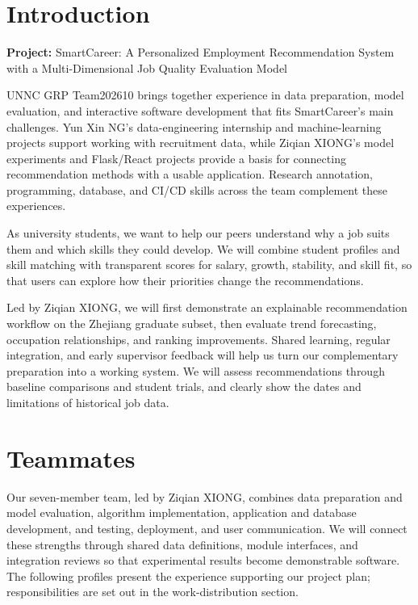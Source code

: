 \documentclass[a4paper,12pt]{article}
\title{\BidTitle}
\author{\BidTeam}
\date{\BidDate}
\newcommand{\BidProjectName}{SmartCareer: A Personalized Employment Recommendation System with a Multi-Dimensional Job Quality Evaluation Model}
\begin{document}
\maketitle
\thispagestyle{plain}
\tableofcontents
\newpage

\section{Introduction}
\noindent\textbf{Project:} \BidProjectName
\par\medskip
UNNC GRP Team202610 brings together experience in data preparation, model evaluation, and interactive software development that fits SmartCareer's main challenges. Yun Xin NG's data-engineering internship and machine-learning projects support working with recruitment data, while Ziqian XIONG's model experiments and Flask/React projects provide a basis for connecting recommendation methods with a usable application. Research annotation, programming, database, and CI/CD skills across the team complement these experiences.

As university students, we want to help our peers understand why a job suits them and which skills they could develop. We will combine student profiles and skill matching with transparent scores for salary, growth, stability, and skill fit, so that users can explore how their priorities change the recommendations.

Led by Ziqian XIONG, we will first demonstrate an explainable recommendation workflow on the Zhejiang graduate subset, then evaluate trend forecasting, occupation relationships, and ranking improvements. Shared learning, regular integration, and early supervisor feedback will help us turn our complementary preparation into a working system. We will assess recommendations through baseline comparisons and student trials, and clearly show the dates and limitations of historical job data.

\newpage
\section{Teammates}
Our seven-member team, led by Ziqian XIONG, combines data preparation and model evaluation, algorithm implementation, application and database development, and testing, deployment, and user communication. We will connect these strengths through shared data definitions, module interfaces, and integration reviews so that experimental results become demonstrable software. The following profiles present the experience supporting our project plan; responsibilities are set out in the work-distribution section.
\end{document}
